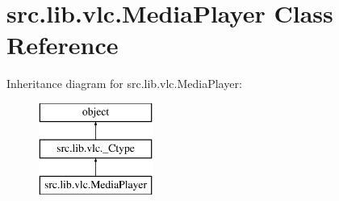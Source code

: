 \hypertarget{classsrc_1_1lib_1_1vlc_1_1MediaPlayer}{}\section{src.\+lib.\+vlc.\+Media\+Player Class Reference}
\label{classsrc_1_1lib_1_1vlc_1_1MediaPlayer}
Inheritance diagram for src.\+lib.\+vlc.\+Media\+Player\+:\begin{figure}[H]
\begin{center}
\leavevmode
\includegraphics[height=3.000000cm]{classsrc_1_1lib_1_1vlc_1_1MediaPlayer}
\end{center}
\end{figure}
